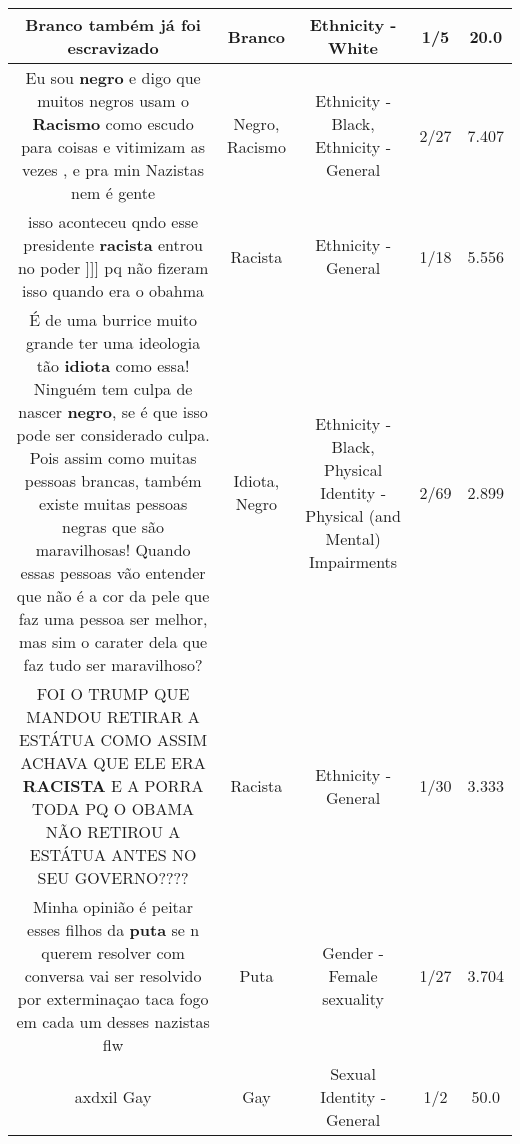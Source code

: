 \documentclass[11pt]{article}
\newlength\mylength
\begin{document}
\begin{center}
\begin{longtable}{|C{.65\mylength}|C{.30\mylength}|C{.12\mylength}|C{.12\mylength}|C{.12\mylength}|}
  \small Branco também já foi escravizado\normalsize   & Branco & Ethnicity - White & 1/5 & 20.0 \\  \hline
  \small Eu sou \textbf{negro} e digo que muitos negros usam o \textbf{Racismo} como escudo para coisas e vitimizam as vezes , e pra min Nazistas nem é gente\normalsize   & Negro, Racismo & Ethnicity - Black, Ethnicity - General & 2/27 & 7.407 \\  \hline
  \small isso  aconteceu  qndo  esse   presidente    \textbf{racista}   entrou  no  poder   ]]]    pq  não  fizeram  isso   quando  era  o  obahma\normalsize   & Racista & Ethnicity - General & 1/18 & 5.556 \\  \hline
  \small É de uma burrice muito grande ter uma ideologia tão \textbf{idiota} como essa! Ninguém tem culpa de nascer \textbf{negro}, se é que isso pode ser considerado culpa. Pois assim como muitas pessoas brancas, também existe muitas pessoas negras que são maravilhosas! Quando essas pessoas vão entender que não é a cor da pele que faz uma pessoa ser melhor, mas sim o carater dela que faz tudo ser maravilhoso?\normalsize   & Idiota, Negro & Ethnicity - Black, Physical Identity - Physical (and Mental) Impairments & 2/69 & 2.899 \\  \hline
  \small FOI O TRUMP QUE MANDOU RETIRAR A ESTÁTUA COMO ASSIM ACHAVA QUE ELE ERA \textbf{RACISTA} E A PORRA TODA PQ O OBAMA NÃO RETIROU A ESTÁTUA ANTES NO SEU GOVERNO????\normalsize   & Racista & Ethnicity - General & 1/30 & 3.333 \\  \hline
  \small Minha opinião é peitar esses filhos da \textbf{puta} se n querem resolver com conversa vai ser resolvido por exterminaçao taca fogo em cada um desses nazistas flw\normalsize   & Puta & Gender - Female sexuality & 1/27 & 3.704 \\  \hline
  \small axdxil Gay\normalsize   & Gay & Sexual Identity - General & 1/2 & 50.0 \\  \hline

\end{longtable}
\end{center}
\end{document}
